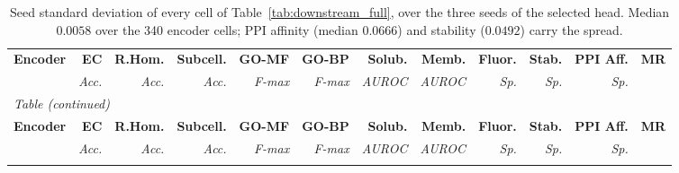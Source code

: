 \begingroup
\fontsize{7}{8.6}\selectfont
\setlength{\tabcolsep}{2pt}
\renewcommand{\arraystretch}{1.08}
\begin{longtable}{lrrrrrrrrrrr}
\caption{Seed standard deviation of every cell of Table~\ref{tab:downstream_full}, over the three seeds of the
selected head. Median $0.0058$ over the 340 encoder cells; PPI affinity (median $0.0666$) and stability
($0.0492$) carry the spread.}\label{tab:downstream_full_sd}\\
\toprule
\rowcolor{CompassLavender!32}
\textbf{Encoder} & \textbf{EC} & \textbf{R.Hom.} & \textbf{Subcell.} & \textbf{GO-MF} & \textbf{GO-BP} & \textbf{Solub.} & \textbf{Memb.} & \textbf{Fluor.} & \textbf{Stab.} & \textbf{PPI Aff.} & \textbf{MR} \\
 & \textit{Acc.} & \textit{Acc.} & \textit{Acc.} & \textit{F-max} & \textit{F-max} & \textit{AUROC} & \textit{AUROC} & \textit{Sp.} & \textit{Sp.} & \textit{Sp.} & \\

\midrule
\endfirsthead
\multicolumn{12}{l}{\small\textit{Table \thetable{} (continued)}}\\
\toprule
\rowcolor{CompassLavender!32}
\textbf{Encoder} & \textbf{EC} & \textbf{R.Hom.} & \textbf{Subcell.} & \textbf{GO-MF} & \textbf{GO-BP} & \textbf{Solub.} & \textbf{Memb.} & \textbf{Fluor.} & \textbf{Stab.} & \textbf{PPI Aff.} & \textbf{MR} \\
 & \textit{Acc.} & \textit{Acc.} & \textit{Acc.} & \textit{F-max} & \textit{F-max} & \textit{AUROC} & \textit{AUROC} & \textit{Sp.} & \textit{Sp.} & \textit{Sp.} & \\

\midrule
\endhead
\midrule
\endfoot
\bottomrule
\endlastfoot


\end{longtable}
